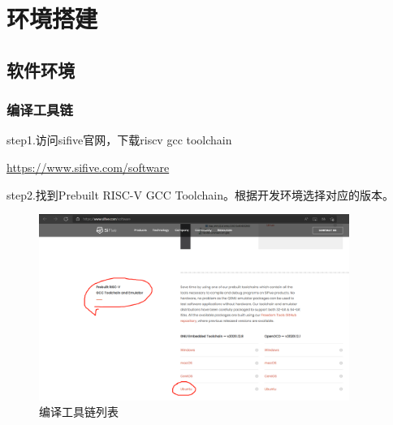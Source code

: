 %
%
%
%
%

\chapter{环境搭建}

\section{软件环境}

\subsection{编译工具链}
step1.访问sifive官网，下载riscv gcc toolchain

\href{https://www.sifive.com/software}{https://www.sifive.com/software}

step2.找到Prebuilt RISC-V GCC Toolchain。根据开发环境选择对应的版本。

\begin{figure}[htbp]
    \vspace{13pt} %
    \centering
    \includegraphics[width=0.9\textwidth]{images/toolchain.png}
    \caption{编译工具链列表}\label{编译工具链列表} %
\end{figure}

